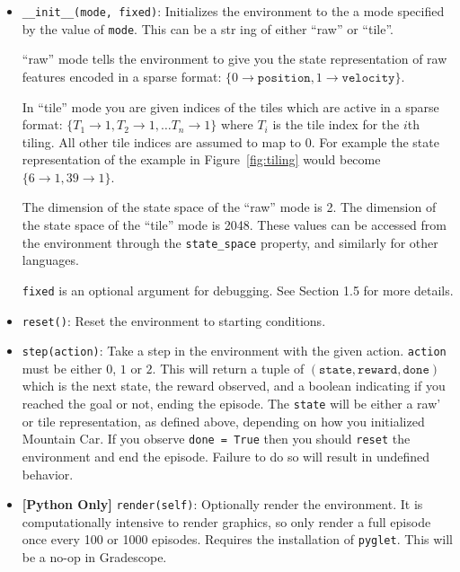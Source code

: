 \documentclass[11pt,addpoints,answers]{exam}
\begin{document}
\begin{itemize}
    \item \texttt{\_\_init\_\_(mode, fixed)}: Initializes the environment to the a mode specified by the value of \texttt{mode}. This can be a str ing of either ``raw'' or ``tile''. 
    
    ``raw'' mode tells the environment to give you the state representation of raw features encoded in a sparse format: $\{0 \rightarrow \texttt{position}, 1 \rightarrow \texttt{velocity}\}$.
    
    In ``tile'' mode you are given indices of the tiles which are active in a sparse format: $\{T_1 \rightarrow 1, T_2 \rightarrow 1, \ldots T_n \rightarrow 1\}$ where $T_i$ is the tile index for the $i$th tiling. All other tile indices are assumed to map to 0. For example the state representation of the example in Figure~\ref{fig:tiling} would become $\{6 \rightarrow 1, 39 \rightarrow 1\}$.
    
    The dimension of the state space of the ``raw'' mode is 2. The dimension of the state space of the ``tile'' mode is 2048. These values can be accessed from the environment through the \texttt{state\_space} property, and similarly for other languages.
    
    \texttt{fixed} is an optional argument for debugging. See Section 1.5 for more details.
    
    \item \texttt{reset()}: Reset the environment to starting conditions.
    \item \texttt{step(action)}: Take a step in the environment with the given action. \texttt{action} must be either $0$, $1$ or $2$. This will return a tuple of $(\texttt{state}, \texttt{reward}, \texttt{done})$ which is the next state, the reward observed, and a boolean indicating if you reached the goal or not, ending the episode. The \texttt{state} will be either a raw' or tile representation, as defined above, depending on how you initialized Mountain Car.  If you observe \texttt{done = True} then you should \texttt{reset} the environment and end the episode. Failure to do so will result in undefined behavior.
    \item \textbf{[Python Only]} \texttt{render(self)}: Optionally render the environment. It is computationally intensive to render graphics, so only render a full episode once every 100 or 1000 episodes. Requires the installation of \texttt{pyglet}. This will be a no-op in Gradescope.
\end{itemize}
\end{document}
